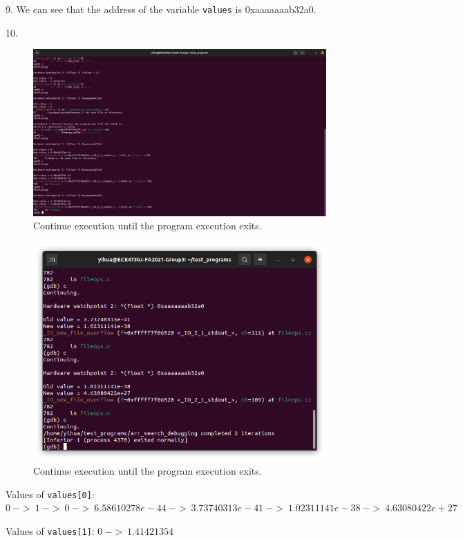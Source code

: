 \documentclass[a4paper]{article}
\begin{document}
9. We can see that the address of the variable \texttt{values} is 0xaaaaaaab32a0.

10.
\begin{figure}[H]
    \centering
    \includegraphics[width=1\textwidth]{8.png}
    \caption{Continue execution until the program execution exits.}
\end{figure}
\begin{figure}[H]
    \centering
    \includegraphics[width=1\textwidth]{9.png}
    \caption{Continue execution until the program execution exits.}
\end{figure}
Values of \texttt{values[0]}: $0\ ->\ 1\ ->\ 0\ ->\ 6.58610278e-44\ ->\ 3.73740313e-41\ ->\ 1.02311141e-38\ ->\ 4.63080422e+27$

Values of \texttt{values[1]}: $0\ ->\ 1.41421354$
\end{document}
